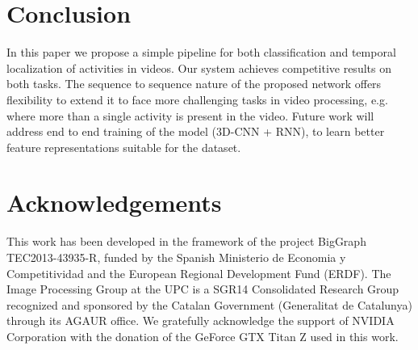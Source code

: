 \documentclass{article}
\begin{document}
\section{Conclusion}

In this paper we propose a simple pipeline for both classification and temporal localization of activities in videos. Our system achieves competitive results on both tasks. The sequence to sequence nature of the proposed network offers flexibility to extend it to face more challenging tasks in video processing, e.g. where more than a single activity is present in the video. Future work will address end to end training of the model (3D-CNN + RNN), to learn better feature representations suitable for the dataset.


\section{Acknowledgements}

This work has been developed in the framework of the project BigGraph TEC2013-43935-R, funded by the Spanish Ministerio de Economia y Competitividad and the European Regional Development Fund (ERDF). The Image Processing Group at the UPC is a SGR14 Consolidated Research Group recognized and sponsored by the Catalan Government (Generalitat de Catalunya) through its AGAUR office. We gratefully acknowledge the support of NVIDIA Corporation with the donation of the GeForce GTX Titan Z used in this work.

\section*{}{\small


}
\end{document}
